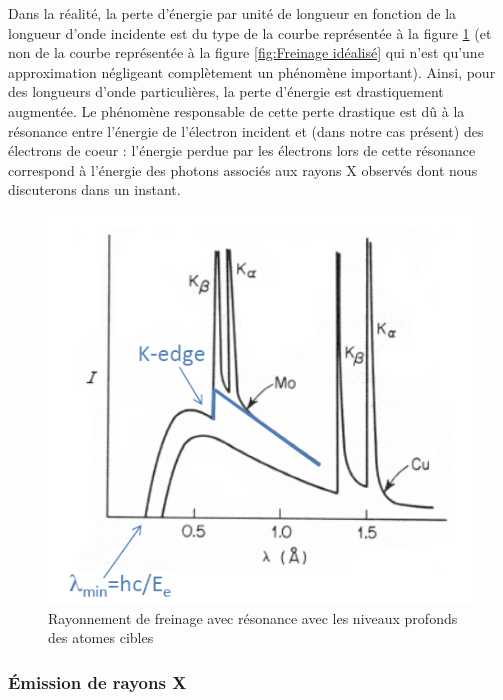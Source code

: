 Dans la réalité, la perte d'énergie par unité de longueur en fonction de la longueur d'onde incidente est du type de la courbe représentée à la figure \ref{fig:Rayonnement freinage} (et non de la courbe représentée à la figure \ref{fig:Freinage idéalisé} qui n'est qu'une approximation négligeant complètement un phénomène important). Ainsi, pour des longueurs d'onde particulières, la perte d'énergie est drastiquement augmentée. Le phénomène responsable de cette perte drastique est dû à la résonance entre l'énergie de l'électron incident et (dans notre cas présent) des électrons de coeur : l'énergie perdue par les électrons lors de cette résonance correspond à l'énergie des photons associés aux rayons X observés dont nous discuterons dans un instant.\\
\begin{figure}[htp]
    \centering
    \includegraphics[scale=1.0]{Images2/RayonnementFreinage.PNG}
    \caption{Rayonnement de freinage avec résonance avec les niveaux profonds des atomes cibles}
    \label{fig:Rayonnement freinage}
\end{figure}


\subsubsection{Émission de rayons X}


